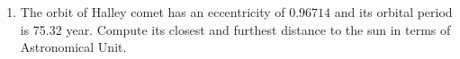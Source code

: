 \documentclass{article}
\begin{document}
\begin{enumerate}
\begin{figure}[ht]
  \end{figure}

\item The orbit of Halley comet has an eccentricity of $0.96714$ and its orbital period is 75.32 year. Compute its closest and furthest distance to the sun in terms of Astronomical Unit.
\end{enumerate}
\end{document}
